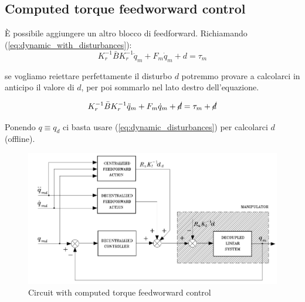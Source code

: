 \subsection{Computed torque	feedworward control}
È possibile aggiungere un altro blocco di feedforward.
Richiamando (\ref{eq:dynamic_with_disturbances}):
\boldmath
$$
K_r^{-1}\bar{B}K_r^{-1}\ddot{q}_m + F_m\dot{q}_m + d = \tau_m
$$
\unboldmath

se vogliamo reiettare perfettamente il disturbo $d$ potremmo provare a calcolarci in anticipo il valore di $d$, per poi sommarlo nel lato destro dell'equazione.

\boldmath
$$
K_r^{-1}\bar{B}K_r^{-1}\ddot{q}_m + F_m\dot{q}_m + \cancel{d} = \tau_m + \cancel{d}
$$
\unboldmath

Ponendo $q\equiv q_d$ ci basta usare (\ref{eq:dynamic_disturbances}) per calcolarci $d$ (offline).
 
\begin{figure}[H]
	\centering
	\includegraphics[width=0.7\linewidth]{images/computed_torque}
	\caption{Circuit with computed torque feedworward control}
	\label{fig:computedtorque}
\end{figure}



